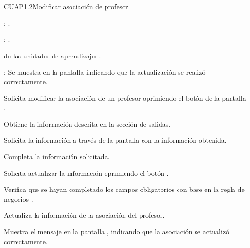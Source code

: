 \begin{UseCase}{CUAP1.2}{Modificar asociación de profesor}
{\begin{UClist}
			\UCli {}: \ioObtener.
			
			\UCli {}: \ioObtener.
			
			\UCli {} de las unidades de aprendizaje: \ioObtener.
			
			\UCli {}: Se muestra en la pantalla  indicando que la actualización se realizó correctamente.
		\end{UClist}
	}
\end{UseCase}

\begin{UCtrayectoria}
	\UCpaso [\UCactor] Solicita modificar la asociación de un profesor oprimiendo el botón  de la pantalla . 
	
	\UCpaso [\UCsist] Obtiene la información descrita en la sección de salidas.
	
	\UCpaso [\UCsist] Solicita la información a través de la pantalla  con la información obtenida.
	
	\UCpaso [\UCactor] Completa la información solicitada. \label{CUAP1.2:CompletaInfo}
	
	\UCpaso [\UCactor] Solicita actualizar la información oprimiendo el botón . 
	
	\UCpaso [\UCsist] Verifica que se hayan completado los campos obligatorios con base en la regla de negocios . 
	
	\UCpaso [\UCsist] Actualiza la información de la asociación del profesor.
	
	\UCpaso [\UCsist] Muestra el mensaje  en la pantalla , indicando que la asociación se actualizó correctamente.	
	
\end{UCtrayectoria}


